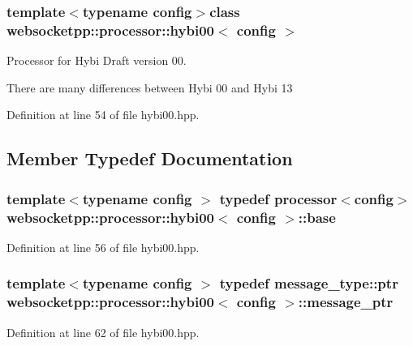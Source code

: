 \subsubsection*{template$<$typename config$>$class websocketpp\+::processor\+::hybi00$<$ config $>$}

Processor for Hybi Draft version 00. 

There are many differences between Hybi 00 and Hybi 13 

Definition at line 54 of file hybi00.\+hpp.



\subsection{Member Typedef Documentation}
\hypertarget{classwebsocketpp_1_1processor_1_1hybi00_ae8842975f6937e834d7df16ecf5b756f}{}
\subsubsection[{base}]{\setlength{\rightskip}{0pt plus 5cm}template$<$typename config $>$ typedef {\bf processor}$<$config$>$ {\bf websocketpp\+::processor\+::hybi00}$<$ config $>$\+::{\bf base}}\label{classwebsocketpp_1_1processor_1_1hybi00_ae8842975f6937e834d7df16ecf5b756f}


Definition at line 56 of file hybi00.\+hpp.

\hypertarget{classwebsocketpp_1_1processor_1_1hybi00_a300a0810d09570108e3dd747d97a8257}{}
\subsubsection[{message\+\_\+ptr}]{\setlength{\rightskip}{0pt plus 5cm}template$<$typename config $>$ typedef message\+\_\+type\+::ptr {\bf websocketpp\+::processor\+::hybi00}$<$ config $>$\+::{\bf message\+\_\+ptr}}\label{classwebsocketpp_1_1processor_1_1hybi00_a300a0810d09570108e3dd747d97a8257}


Definition at line 62 of file hybi00.\+hpp.

\hypertarget{classwebsocketpp_1_1processor_1_1hybi00_a68b8a926b9fc5fcd296cb698920280ab}{}
